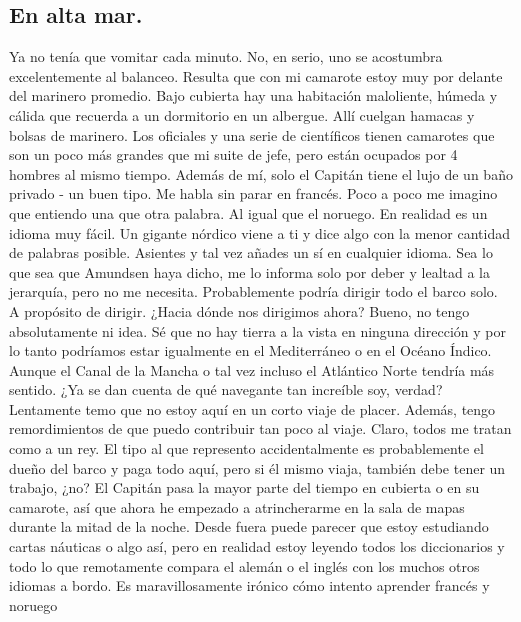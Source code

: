 \documentclass{article}
\begin{document}
    \subsection{En alta mar.}
    \noindent Ya no tenía que vomitar cada minuto. No, en serio, uno se acostumbra excelentemente al balanceo. Resulta que
    con
    mi camarote estoy muy por delante del marinero promedio. Bajo cubierta hay una habitación maloliente, húmeda y
    cálida que recuerda a un dormitorio en un albergue. Allí cuelgan hamacas y bolsas de marinero. Los oficiales y
    una
    serie de científicos tienen camarotes que son un poco más grandes que mi suite de jefe, pero están ocupados por
    4
    hombres al mismo tiempo. Además de mí, solo el Capitán tiene el lujo de un baño privado - un buen tipo. Me habla
    sin parar en francés. Poco a poco me imagino que entiendo una que otra palabra. Al igual que el noruego. En
    realidad es un idioma muy fácil. Un gigante nórdico viene a ti y dice algo con la menor cantidad de palabras
    posible. Asientes y tal vez añades un sí en cualquier idioma. Sea lo que sea que Amundsen haya dicho, me lo
    informa solo por deber y lealtad a la jerarquía, pero no me necesita. Probablemente podría dirigir todo el barco
    solo.\\
    \noindent A propósito de dirigir. ¿Hacia dónde nos dirigimos ahora? Bueno, no tengo absolutamente ni idea. Sé que no hay
    tierra a la vista en ninguna dirección y por lo tanto podríamos estar igualmente en el Mediterráneo o en el
    Océano
    Índico. Aunque el Canal de la Mancha o tal vez incluso el Atlántico Norte tendría más sentido. ¿Ya se dan cuenta
    de qué navegante tan increíble soy, verdad?\\
    \noindent Lentamente temo que no estoy aquí en un corto viaje de placer. Además, tengo remordimientos de que puedo
    contribuir tan poco al viaje. Claro, todos me tratan como a un rey. El tipo al que represento accidentalmente es
    probablemente el dueño del barco y paga todo aquí, pero si él mismo viaja, también debe tener un trabajo, ¿no?
    El
    Capitán pasa la mayor parte del tiempo en cubierta o en su camarote, así que ahora he empezado a atrincherarme
    en
    la sala de mapas durante la mitad de la noche. Desde fuera puede parecer que estoy estudiando cartas náuticas o
    algo así, pero en realidad estoy leyendo todos los diccionarios y todo lo que remotamente compara el alemán o el
    inglés con los muchos otros idiomas a bordo. Es maravillosamente irónico cómo intento aprender francés y noruego
\end{document}
